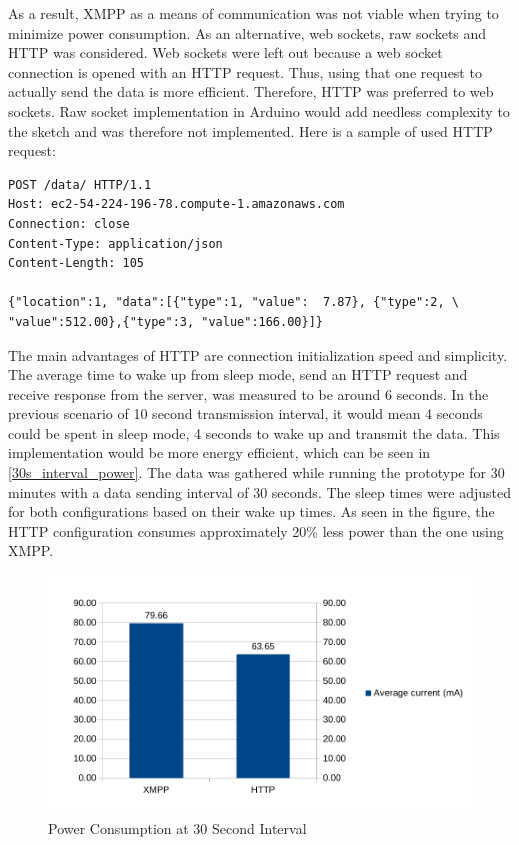 As a result, XMPP as a means of communication was not viable when trying to minimize power consumption. As an alternative, web sockets, raw sockets and HTTP was considered. Web sockets were left out because a web socket connection is opened with an HTTP request. Thus, using that one request to actually send the data is more efficient. Therefore, HTTP was preferred to web sockets. Raw socket implementation in Arduino would add needless complexity to the sketch and was therefore not implemented. Here is a sample of used HTTP request:

\begin{lstlisting}
POST /data/ HTTP/1.1
Host: ec2-54-224-196-78.compute-1.amazonaws.com
Connection: close
Content-Type: application/json
Content-Length: 105

{"location":1, "data":[{"type":1, "value":  7.87}, {"type":2, \
"value":512.00},{"type":3, "value":166.00}]}
\end{lstlisting}

The main advantages of HTTP are connection initialization speed and simplicity. The average time to wake up from sleep mode, send an HTTP request and receive response from the server, was measured to be around 6 seconds. In the previous scenario of 10 second transmission interval, it would mean 4 seconds could be spent in sleep mode, 4 seconds to wake up and transmit the data. This implementation would be more energy efficient, which can be seen in \autoref{30s_interval_power}. The data was gathered while running the prototype for 30 minutes with a data sending interval of 30 seconds. The sleep times were adjusted for both configurations based on their wake up times. As seen in the figure, the HTTP configuration consumes approximately 20\% less power than the one using XMPP.

\begin{figure}[h]
\centering
\includegraphics[scale=0.85]{4/figures/30s_xmpp_vs_http.pdf}
\caption{Power Consumption at 30 Second Interval}
\label{30s_interval_power}
\end{figure}

